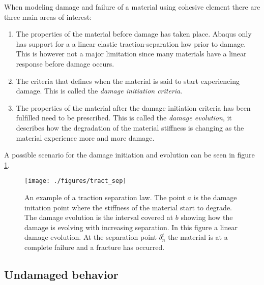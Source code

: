 \documentclass[grain_boundary_law.tex]{subfiles}
\begin{document}
When modeling damage and failure of a material using cohesive element there are three main areas of interest:

\begin{enumerate}
\item The properties of the material before damage has taken place. Abaqus only has support for a a linear elastic traction-separation law prior to damage. This is however not a major limitation since many materials have a linear response before damage occurs. 

\item The criteria that defines when the material is said to start experiencing damage. This is called the \textit{damage initiation criteria}.

\item The properties of the material after the damage initiation criteria has been fulfilled need to be prescribed. This is called the \textit{damage evolution}, it describes how the degradation of the material stiffness is changing as the material experience more and more damage.
\end{enumerate}
%
A possible scenario for the damage initiation and evolution can be seen in figure \ref{fig:tract_sep}.



\begin{figure}
\centering
  \texttt{[image: ./figures/tract\_sep]}
\caption{An example of a traction separation law. The point $a$ is the damage initation point where the stiffness of the material start to degrade. The damage evolution is the interval covered at $b$ showing how the damage is evolving with increasing separation. In this figure a linear damage evolution. At the separation point $\delta_n^t$ the material is at a complete failure and a fracture has occurred.}
\label{fig:tract_sep}
\end{figure}

\subsection{Undamaged behavior}
 
\end{document}
